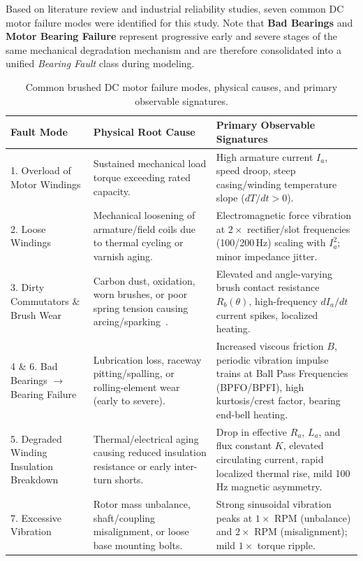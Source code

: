 \documentclass[11pt,a4paper]{article}
\begin{document}
Based on literature review and industrial reliability studies, seven common DC motor failure modes were identified for this study. Note that \textbf{Bad Bearings} and \textbf{Motor Bearing Failure} represent progressive early and severe stages of the same mechanical degradation mechanism and are therefore consolidated into a unified \emph{Bearing Fault} class during modeling.

\begin{table}[H]
\centering
\caption{Common brushed DC motor failure modes, physical causes, and primary observable signatures.}
\label{tab:common_faults}
\renewcommand{\arraystretch}{1.2}
\begin{tabular}{@{}p{}p{}p{}@{}}
\toprule
\textbf{Fault Mode} & \textbf{Physical Root Cause} & \textbf{Primary Observable Signatures} \\
\midrule
1. Overload of Motor Windings & Sustained mechanical load torque exceeding rated capacity. & High armature current $I_a$, speed droop, steep casing/winding temperature slope ($dT/dt > 0$). \\
2. Loose Windings & Mechanical loosening of armature/field coils due to thermal cycling or varnish aging. & Electromagnetic force vibration at $2\times$ rectifier/slot frequencies (100/200\,Hz) scaling with $I_a^2$; minor impedance jitter. \\
3. Dirty Commutators \& Brush Wear & Carbon dust, oxidation, worn brushes, or poor spring tension causing arcing/sparking~\cite{yousefnejad2025}. & Elevated and angle-varying brush contact resistance $R_b(\theta)$, high-frequency $dI_a/dt$ current spikes, localized heating. \\
4 \& 6. Bad Bearings $\rightarrow$ Bearing Failure & Lubrication loss, raceway pitting/spalling, or rolling-element wear (early to severe). & Increased viscous friction $B$, periodic vibration impulse trains at Ball Pass Frequencies (BPFO/BPFI), high kurtosis/crest factor, bearing end-bell heating. \\
5. Degraded Winding Insulation Breakdown & Thermal/electrical aging causing reduced insulation resistance or early inter-turn shorts. & Drop in effective $R_a$, $L_a$, and flux constant $K$, elevated circulating current, rapid localized thermal rise, mild 100\,Hz magnetic asymmetry. \\
7. Excessive Vibration & Rotor mass unbalance, shaft/coupling misalignment, or loose base mounting bolts. & Strong sinusoidal vibration peaks at $1\times$ RPM (unbalance) and $2\times$ RPM (misalignment); mild $1\times$ torque ripple. \\
\bottomrule
\end{tabular}
\end{table}
\end{document}
